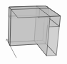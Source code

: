 \documentclass[orivec]{llncs} \usepackage[T1]{fontenc}
\begin{document}
{\begin{example}
\[  \begin{tikzpicture}[line join=round,opacity=0.7]
\draw[arrows=->](.786,-.786)--(.435,-.115);
\filldraw[fill=lightgray](1.421,-.18)--(1.723,-.164)--(1.819,1.061)--(1.5,1.05)--cycle;
\filldraw[fill=lightgray](2.203,-.696)--(2.345,.703)--(1.819,1.061)--(1.723,-.164)--cycle;
\filldraw[fill=lightgray](1.855,-.718)--(2.203,-.696)--(1.723,-.164)--(1.421,-.18)--cycle;
\filldraw[fill=gray](1.479,.73)--(1.794,.743)--(1.819,1.061)--(1.5,1.05)--cycle;
\filldraw[fill=lightgray](.496,-.231)--(1.723,-.164)--(1.819,1.061)--(.524,1.017)--cycle;
\filldraw[fill=lightgray](1.831,-.283)--(1.935,.982)--(1.819,1.061)--(1.723,-.164)--cycle;
\filldraw[fill=lightgray](.561,-.354)--(1.831,-.283)--(1.723,-.164)--(.496,-.231)--cycle;
\filldraw[fill=lightgray,draw=none](1.583,.639)--(1.518,-.3)--(1.831,-.283)--(1.908,.652)--cycle;
\draw(1.518,-.3)--(1.831,-.283)--(1.908,.652);
\filldraw[fill=gray](1.583,.639)--(1.908,.652)--(1.794,.743)--(1.479,.73)--cycle;
\filldraw[fill=lightgray,draw=none](1.583,.639)--(1.908,.652)--(1.794,.743)--(1.479,.73)--cycle;
\draw(1.908,.652)--(1.794,.743)--(1.479,.73);
\filldraw[fill=lightgray](2.308,.336)--(2.345,.703)--(1.819,1.061)--(1.794,.743)--cycle;
\filldraw[fill=lightgray](.517,.692)--(1.794,.743)--(1.819,1.061)--(.524,1.017)--cycle;
\filldraw[fill=gray](1.908,.652)--(1.935,.982)--(1.819,1.061)--(1.794,.743)--cycle;
\filldraw[fill=lightgray,draw=none](1.583,.639)--(1.908,.652)--(1.935,.982)--(1.605,.97)--cycle;
\draw(1.908,.652)--(1.935,.982)--(1.605,.97);
\filldraw[fill=gray](1.583,.639)--(1.908,.652)--(1.935,.982)--(1.605,.97)--cycle;
\filldraw[fill=lightgray,draw=none](1.583,.639)--(1.944,.319)--(2.308,.336)--(1.908,.652)--cycle;
\draw(1.944,.319)--(2.308,.336)--(1.908,.652);
\filldraw[fill=lightgray](1.855,-.718)--(1.976,.687)--(1.5,1.05)--(1.421,-.18)--cycle;
\filldraw[fill=lightgray,draw=none](.585,.598)--(1.583,.639)--(1.479,.73)--(.517,.692)--cycle;
\draw(1.479,.73)--(.517,.692)--(.585,.598);
\filldraw[fill=lightgray](.561,-.354)--(.593,.934)--(.524,1.017)--(.496,-.231)--cycle;
\filldraw[fill=gray](1.583,.639)--(1.605,.97)--(1.5,1.05)--(1.479,.73)--cycle;
\filldraw[fill=lightgray,draw=none](.561,-.354)--(1.518,-.3)--(1.605,.97)--(.593,.934)--cycle;
\draw(1.605,.97)--(.593,.934)--(.561,-.354)--(1.518,-.3);
\filldraw[fill=lightgray](.839,.641)--(2.345,.703)--(1.819,1.061)--(.524,1.017)--cycle;
\filldraw[fill=gray](1.605,.97)--(1.935,.982)--(1.819,1.061)--(1.5,1.05)--cycle;
\filldraw[fill=lightgray](1.976,.687)--(2.345,.703)--(1.819,1.061)--(1.5,1.05)--cycle;
\filldraw[fill=lightgray](.593,.934)--(1.935,.982)--(1.819,1.061)--(.524,1.017)--cycle;

\end{tikzpicture}\]
\end{example}}
\end{document}
